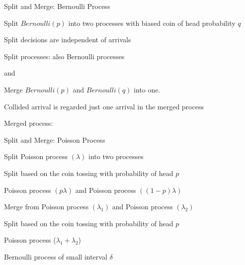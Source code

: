\documentclass[fleqn,aspectratio=169]{beamer}
\begin{document}
\begin{frame}{Split and Merge: Bernoulli Process}

{
\small
\plitemsep 0.05in
\bci
\item Split $Bernoulli(p)$ into two processes with biased coin of head probability $q$

\item<2-> Split decisions are independent of arrivals

\item<3-> Split processes: also Bernoulli processes

\item<3->  and 

\eci

\medskip
\centering
{}

}
{
\small
\plitemsep 0.05in
\bci
\item Merge $Bernoulli(p)$ and $Bernoulli(q)$ into one.

\item<4-> Collided arrival is regarded just one arrival in the merged process

\item<5-> Merged process: 
\eci

\centering
{}

}

\end{frame}

\begin{frame}{Split and Merge: Poisson Process}

\plitemsep 0.1in
\bci
\item Split Poisson process $(\lambda)$ into two processes

\bci
\item<2-> Split based on the coin tossing with probability of head $p$

\item<3-> Poisson process $(p\lambda)$ and Poisson process $((1-p)\lambda)$
\eci

\item Merge from Poisson process $(\lambda_1)$ and Poisson process $(\lambda_2)$
\bci
\item<4-> Split based on the coin tossing with probability of head $p$

\item<5-> Poisson process ($\lambda_1 + \lambda_2$)

\item<6-> Bernoulli process of small interval $\delta$
\eci
\eci
\end{frame}
\end{document}
